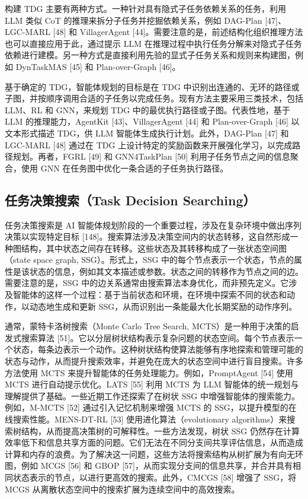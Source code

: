 \documentclass[10pt,UTF8,fontset=fandol]{ctexart}
\begin{document}
构建 TDG 主要有两种方式。一种针对具有隐式子任务依赖关系的任务，利用 LLM 类似 CoT 的推理来拆分子任务并挖掘依赖关系，例如 DAG-Plan [47]、LGC-MARL [48] 和 VillagerAgent [44]。需要注意的是，前述结构化组织推理方法也可以直接应用于此，通过提示 LLM 在推理过程中执行任务分解来对隐式子任务依赖进行建模。另一种方式是直接利用先验的显式子任务关系和规则来构建图，例如 DynTaskMAS [45] 和 Plan-over-Graph [46]。

基于确定的 TDG，智能体规划的目标是在 TDG 中识别出连通的、无环的路径或子图，并按顺序调用合适的子任务以完成任务。现有方法主要采用三类技术，包括 LLM、RL 和 GNN，来规划 TDG 中的最优执行路径或子图。代表性地，基于 LLM 的推理能力，AgentKit [43]、VillagerAgent [44] 和 Plan-over-Graph [46] 以文本形式描述 TDG，供 LLM 智能体生成执行计划。此外，DAG-Plan [47] 和 LGC-MARL [48] 通过在 TDG 上设计特定的奖励函数来开展强化学习，以完成路径规划。再者，FGRL [49] 和 GNN4TaskPlan [50] 利用子任务节点之间的信息聚合，使用 GNN 在任务图中优化一条合适的子任务执行路径。

\subsection{任务决策搜索（Task Decision Searching）}

任务决策搜索是 AI 智能体规划阶段的一个重要过程，涉及在复杂环境中做出序列决策以实现特定目标 [148]。搜索算法涉及决策空间内的状态转移，这自然形成一种图结构，其中状态之间存在转移。这些状态及其转移构成了一张状态空间图（state space graph, SSG）。形式上，SSG 中的每个节点表示一个状态，节点的属性是该状态的信息，例如其文本描述或参数。状态之间的转移作为节点之间的边。需要注意的是，SSG 中的边关系通常由搜索算法本身优化，而非预先定义。它涉及智能体的这样一个过程：基于当前状态和环境，在环境中探索不同的状态和动作，以动态地生成和更新 SSG，从而识别出一条能最大化长期奖励的动作序列。

通常，蒙特卡洛树搜索（Monte Carlo Tree Search, MCTS）是一种用于决策的启发式搜索算法 [51]。它以分层树状结构表示复杂问题的状态空间。每个节点表示一个状态，每条边表示一个动作。这种树状结构使算法能够有序地探索和管理可能的状态与动作，从而提升搜索效率，并避免在庞大的状态空间中进行盲目搜索。许多方法使用 MCTS 来提升智能体的任务处理能力。例如，PromptAgent [54] 使用 MCTS 进行自动提示优化。LATS [55] 利用 MCTS 为 LLM 智能体的统一规划与理解提供了基础。一些近期工作还探索了在树状 SSG 中增强智能体的搜索能力。例如，M-MCTS [52] 通过引入记忆机制来增强 MCTS 的 SSG，以提升模型的在线搜索性能。MENS-DT-RL [53] 使用进化算法（evolutionary algorithms）来搜索树结构，从而提高决策树的可解释性。一些方法发现，树状 SSG 仍然存在计算效率低下和信息共享方面的问题。它们无法在不同分支间共享评估信息，从而造成计算和内存的浪费。为了解决这一问题，这些方法将搜索结构从树扩展为有向无环图，例如 MCGS [56] 和 GBOP [57]，从而实现分支间的信息共享，并合并具有相同状态表示的节点，以进行更高效的搜索。此外，CMCGS [58] 增强了 SSG，将 MCGS 从离散状态空间中的搜索扩展为连续空间中的高效搜索。
\end{document}
